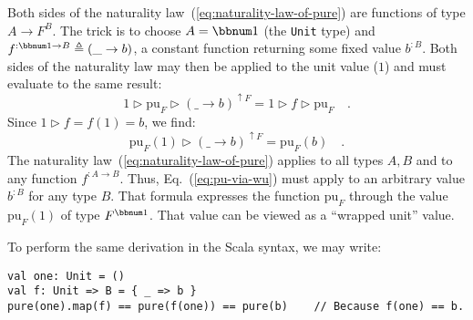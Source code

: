 Both sides of the naturality law~(\ref{eq:naturality-law-of-pure})
are functions of type $A\rightarrow F^{B}$. The trick is to choose
$A=\bbnum 1$ (the \lstinline!Unit! type) and $f^{:\bbnum 1\rightarrow B}\triangleq(\_\rightarrow b)$,
a constant function returning some fixed value $b^{:B}$. Both sides
of the naturality law may then be applied to the unit value ($1$)
and must evaluate to the same result:
\[
1\triangleright\text{pu}_{F}\triangleright(\_\rightarrow b)^{\uparrow F}=1\triangleright f\triangleright\text{pu}_{F}\quad.
\]
Since $1\triangleright f=f(1)=b$, we find:
\begin{equation}
\text{pu}_{F}(1)\triangleright(\_\rightarrow b)^{\uparrow F}=\text{pu}_{F}(b)\quad.\label{eq:pu-via-wu}
\end{equation}
The naturality law~(\ref{eq:naturality-law-of-pure}) applies to
all types $A,B$ and to any function $f^{:A\rightarrow B}$. Thus,
Eq.~(\ref{eq:pu-via-wu}) must apply to an arbitrary value $b^{:B}$
for any type $B$. That formula expresses the function $\text{pu}_{F}$
through the value $\text{pu}_{F}(1)$ of type $F^{\bbnum 1}$. That
value can be viewed as a \textsf{``}wrapped unit\textsf{''}
value. 

To perform the same derivation in the Scala syntax, we may write:
\begin{lstlisting}
val one: Unit = ()
val f: Unit => B = { _ => b }
pure(one).map(f) == pure(f(one)) == pure(b)    // Because f(one) == b.
\end{lstlisting}

